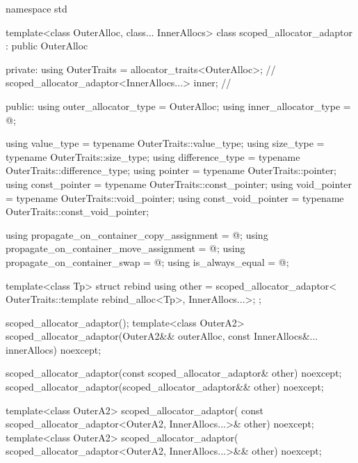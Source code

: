 %
%
%
%
%
%
%
%
%
\begin{codeblock}
namespace std {
  template<class OuterAlloc, class... InnerAllocs>
  class scoped_allocator_adaptor : public OuterAlloc {
  private:
    using OuterTraits = allocator_traits<OuterAlloc>;   // \expos
    scoped_allocator_adaptor<InnerAllocs...> inner;     // \expos

  public:
    using outer_allocator_type = OuterAlloc;
    using inner_allocator_type = @\seebelow@;

    using value_type           = typename OuterTraits::value_type;
    using size_type            = typename OuterTraits::size_type;
    using difference_type      = typename OuterTraits::difference_type;
    using pointer              = typename OuterTraits::pointer;
    using const_pointer        = typename OuterTraits::const_pointer;
    using void_pointer         = typename OuterTraits::void_pointer;
    using const_void_pointer   = typename OuterTraits::const_void_pointer;

    using propagate_on_container_copy_assignment = @\seebelow@;
    using propagate_on_container_move_assignment = @\seebelow@;
    using propagate_on_container_swap            = @\seebelow@;
    using is_always_equal                        = @\seebelow@;

    template<class Tp> struct rebind {
      using other = scoped_allocator_adaptor<
        OuterTraits::template rebind_alloc<Tp>, InnerAllocs...>;
    };

    scoped_allocator_adaptor();
    template<class OuterA2>
      scoped_allocator_adaptor(OuterA2&& outerAlloc,
                               const InnerAllocs&... innerAllocs) noexcept;

    scoped_allocator_adaptor(const scoped_allocator_adaptor& other) noexcept;
    scoped_allocator_adaptor(scoped_allocator_adaptor&& other) noexcept;

    template<class OuterA2>
      scoped_allocator_adaptor(
        const scoped_allocator_adaptor<OuterA2, InnerAllocs...>& other) noexcept;
    template<class OuterA2>
      scoped_allocator_adaptor(
        scoped_allocator_adaptor<OuterA2, InnerAllocs...>&& other) noexcept;

}}
\end{codeblock}
